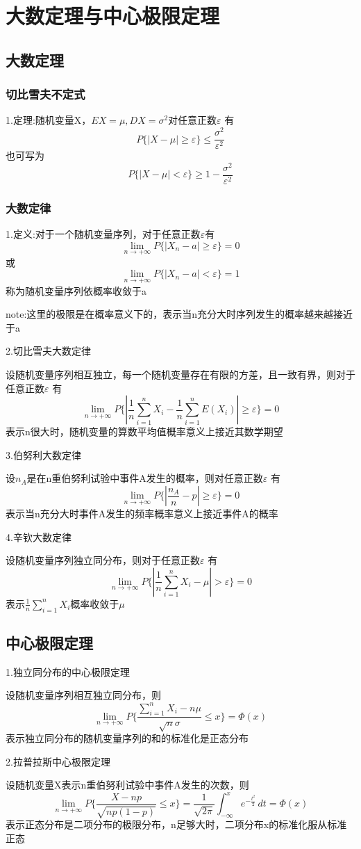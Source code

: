 \documentclass[11pt,twoside,a4paper]{ctexart}
\begin{document}
\section{大数定理与中心极限定理}
\subsection{大数定理}
\subsubsection{切比雪夫不定式} 
1.定理:随机变量X，$EX = \mu  , DX = \sigma ^2 $对任意正数$\varepsilon $ 有
\[P\{|X-\mu|\geq \varepsilon \}\leq \frac{\sigma ^2}{\varepsilon ^2} \]
也可写为
\[P\{|X-\mu| < \varepsilon \}\geq 1 - \frac{\sigma ^2}{\varepsilon ^2}\]  

\subsubsection{大数定律}
1.定义:对于一个随机变量序列，对于任意正数$\varepsilon $有
\[\lim_{n \to +\infty}P\{|X_n - a|\geq \varepsilon\} = 0\]
或
\[\lim_{n \to +\infty}P\{|X_n - a| < \varepsilon\} = 1\]
称为随机变量序列依概率收敛于a

note:这里的极限是在概率意义下的，表示当n充分大时序列发生的概率越来越接近于a

2.切比雪夫大数定律

设随机变量序列相互独立，每一个随机变量存在有限的方差，且一致有界，则对于任意正数$\varepsilon $ 有
\[ \lim_{n \to +\infty}P\{  | \frac{1}{n}\sum _{i=1}^n X_i - \frac{1}{n}\sum _{i=1}^n E(X_i) | \geq \varepsilon \} = 0 \]
表示n很大时，随机变量的算数平均值概率意义上接近其数学期望

3.伯努利大数定律

设$n_A$是在n重伯努利试验中事件A发生的概率，则对任意正数$\varepsilon $ 有
\[\lim_{n \to +\infty}P\{|\frac{n_A}{n} - p|\geq \varepsilon  \} = 0 \]
表示当n充分大时事件A发生的频率概率意义上接近事件A的概率

4.辛钦大数定律

设随机变量序列独立同分布，则对于任意正数$\varepsilon $ 有
\[\lim_{n \to +\infty}P\{|\frac{1}{n}\sum _{i=1}^n X_i -\mu | > \varepsilon \} = 0\]
表示$\frac{1}{n}\sum _{i=1}^n X_i$概率收敛于$\mu $

\subsection{中心极限定理}

1.独立同分布的中心极限定理

设随机变量序列相互独立同分布，则
\[\lim_{n \to +\infty}P\{\frac{\sum _{i=1}^n X_i - n\mu }{\sqrt n \sigma }\leq x \} = \Phi (x)\]
表示独立同分布的随机变量序列的和的标准化是正态分布

2.拉普拉斯中心极限定理

设随机变量X表示n重伯努利试验中事件A发生的次数，则
\[\lim_{n \to +\infty}P\{\frac{X - np}{\sqrt {np(1-p)}} \leq x \} = \frac{1}{\sqrt{2\pi }} \int_{-\infty }^{x}e^{-\frac{t^2}{2}}  \,dt  = \Phi (x)\]
表示正态分布是二项分布的极限分布，n足够大时，二项分布x的标准化服从标准正态
\end{document}
